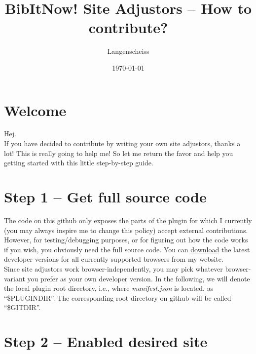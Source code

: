 \documentclass[
a4paper,
12pt,
]
{article}
\begin{document}
\newcommand{\plgdir}{\$PLUGINDIR}
\newcommand{\gitdir}{\$GITDIR}
\newcommand{\tmpl}{0\_TEMPLATE.js}
\newcommand{\exmpl}{0\_EXAMPLE.js}
\newcommand{\pathbox}[1]{\begin{center}\colorbox{light-gray}{#1}\end{center}}
\newcommand{\App}[1]{App.~\ref{#1}}
\newcommand{\Sec}[1]{Sec.~\ref{#1}}
\newcommand{\plgname}{\textbf{BibItNow!}}

\title{{\plgname} Site Adjustors -- How to contribute?}
\date{\today}
\author{Langenscheiss}
\maketitle

\section*{Welcome}

Hej.\\
If you have decided to contribute by writing your own site adjustors, thanks a lot! This is really going to help me! So let me return the favor and help you getting started with this little step-by-step guide.

\section{Step 1 -- Get full source code}\label{sec_1}

The code on this github only exposes the parts of the plugin for which I currently (you may always inspire me to change this policy) accept external contributions. However, for testing/debugging purposes, or for figuring out how the code works if you wish, you obviously need the full source code. You can \href{https://aqpl.mc2.chalmers.se/PDSU/files/BibItNowMultiBrowser.zip}{download} the latest developer versions for all currently supported browsers from my website.\\
Since site adjustors work browser-independently, you may pick whatever browser-variant you prefer as your own developer version. In the following, we will denote the local plugin root directory, i.e., where \textit{manifest.json} is located, as ``\plgdir''. The corresponding root directory on github will be called ``\gitdir''.

\section{Step 2 -- Enabled desired site}\label{sec_2}
\end{document}
